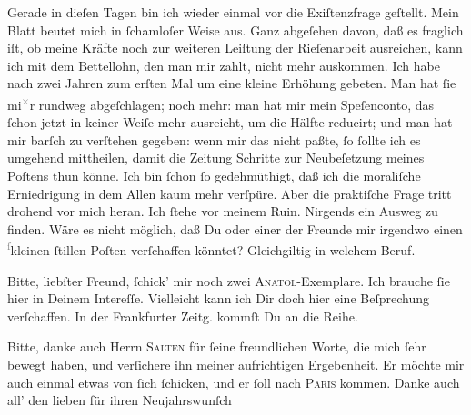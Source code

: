 \pstart
           Gerade in dieſen Tagen bin ich wieder einmal vor die Exiſtenzfrage geſtellt. Mein Blatt beutet mich {\pb}in{ }ſchamloſer Weise aus. Ganz abgeſehen davon, daß
               es fraglich iſt, ob meine Kräfte noch zur weiteren Leiſtung der Rieſenarbeit
               ausreichen, kann ich mit dem Bettellohn, den man mir zahlt, nicht mehr auskommen. Ich
               habe nach zwei Jahren zum erſten Mal um eine kleine Erhöhung gebeten. Man hat{ }ſie mi\substVorne{}\textsuperscript{\textcolor{gray}{×}}\substDazwischen{}r\substHinten{} rundweg abgeſchlagen; noch mehr: man hat mir mein Speſenconto, das{ }ſchon
               jetzt in keiner Weiſe mehr ausreicht, um die Hälfte reducirt; und man hat mir barſch
                  {\pb}zu verſtehen gegeben: wenn mir das nicht paßte,{ }ſo{ }ſollte ich es umgehend mittheilen, damit die Zeitung Schritte zur Neubeſetzung meines Poſtens thun könne.
               Ich bin{ }ſchon{ }ſo gedehmüthigt, daß  ich die moraliſche Erniedrigung in dem Allen kaum mehr verſpüre. Aber die
               praktiſche Frage tritt drohend vor mich heran. Ich{ }ſtehe vor meinem Ruin. Nirgends
               ein Ausweg zu finden. Wäre es nicht möglich, daß Du oder einer der Freunde mir
               irgendwo einen \substVorne{}\textsuperscript{\textcolor{gray}{ſ}}\substDazwischen{}k\substHinten{}leinen{ }ſtillen Poſten verſchaffen könntet? Gleichgiltig in welchem Beruf.\pend
           
\pstart
           {\pb}Bitte, liebſter Freund,{ }ſchick’ mir noch zwei \textsc{Anatol}-Exemplare. Ich brauche{ }ſie hier in Deinem Intereſſe. Vielleicht kann ich Dir
               doch hier eine Beſprechung verſchaffen. In der Frankfurter Zeitg. kommſt Du \label{K_L02605-1v}\label{K_L02605-1} an die Reihe.\pend
           
\pstart
           Bitte, danke auch Herrn \textsc{Salten} für{ }ſeine freundlichen Worte, die mich{ }ſehr bewegt haben, und verſichere ihn
               meiner aufrichtigen Ergebenheit. Er möchte mir auch einmal etwas {\pb}von{ }ſich{ }ſchicken, und er{ }ſoll nach \textsc{Paris} kommen. Danke auch all’ den lieben \label{K_L02605-2v}\label{K_L02605-2} für ihren Neujahrswunſch\pend
           
